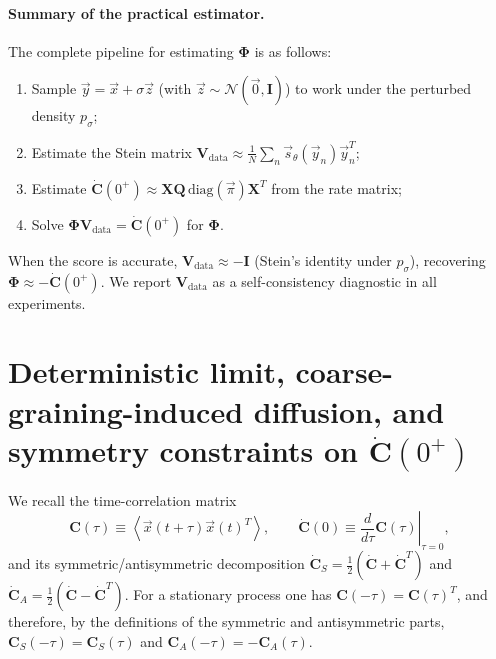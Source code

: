 \documentclass[%
  prl,
  reprint,
  amsmath,
  amssymb,
  aps
]{revtex4-2}
\newcommand{\vvec}[1]{\vec{#1}}
\begin{document}
\paragraph{Summary of the practical estimator.}
The complete pipeline for estimating $\bm{\Phi}$ is as follows:
\begin{enumerate}
\item Sample $\vvec{y}=\vvec{x}+\sigma \vvec{z}$ (with $\vvec{z}\sim\mathcal{N}(\vvec{0},\bm{I})$) to work under the perturbed density $p_\sigma$;
\item Estimate the Stein matrix $\bm{V}_{\mathrm{data}}\approx \frac{1}{N}\sum_n \vvec{s}_\theta(\vvec{y}_n)\vvec{y}_n^T$;
\item Estimate $\dot{\bm{C}}(0^+)\approx \bm{X}\bm{Q}\,\mathrm{diag}(\vvec{\pi})\bm{X}^T$ from the rate matrix;
\item Solve $\bm{\Phi}\bm{V}_{\mathrm{data}}=\dot{\bm{C}}(0^+)$ for $\bm{\Phi}$.
\end{enumerate}
When the score is accurate, $\bm{V}_{\mathrm{data}}\approx -\bm{I}$ (Stein's identity under $p_\sigma$), recovering $\bm{\Phi}\approx -\dot{\bm{C}}(0^+)$. We report $\bm{V}_{\mathrm{data}}$ as a self-consistency diagnostic in all experiments.

\section{Deterministic limit, coarse-graining-induced diffusion, and symmetry constraints on \texorpdfstring{$\dot{\bm{C}}(0^+)$}{Cdot(0+)}}
\label{sec:det_coarse_sym}

We recall the time-correlation matrix
\begin{equation}
\bm{C}(\tau) \equiv \left\langle \vvec{x}(t+\tau)\vvec{x}(t)^T\right\rangle,
\qquad
\dot{\bm{C}}(0) \equiv \left.\frac{d}{d\tau}\bm{C}(\tau)\right|_{\tau=0},
\end{equation}
and its symmetric/antisymmetric decomposition $\dot{\bm{C}}_S=\tfrac12(\dot{\bm{C}}+\dot{\bm{C}}^T)$ and $\dot{\bm{C}}_A=\tfrac12(\dot{\bm{C}}-\dot{\bm{C}}^T)$. For a stationary process one has $\bm{C}(-\tau)=\bm{C}(\tau)^T$, and therefore, by the definitions of the symmetric and antisymmetric parts, $\bm{C}_S(-\tau)=\bm{C}_S(\tau)$ and $\bm{C}_A(-\tau)=-\bm{C}_A(\tau)$.
\end{document}
